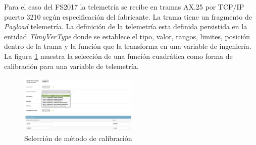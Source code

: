 \documentclass[twoside,twocolumn]{article}
\begin{document}
Para el caso del FS2017 la telemetría se recibe en tramas AX.25 por TCP/IP puerto 3210 según especificación del fabricante. La trama tiene un fragmento de \textit{Payload} telemetría. La definición de la telemetría esta definida persistida en la entidad \textit{TlmyVerType} donde se establece el tipo, valor, rangos, limites, posición dentro de la trama y la función que la transforma en una variable de ingeniería. La figura \ref{fig:MetodoCalibracion} muestra la selección de una función cuadrática como forma de calibración para una variable de telemetría.

\begin{figure}[]
  \caption{Selección de método de calibración}
  \label{fig:MetodoCalibracion}
  \centering
  \includegraphics[width=0.5\textwidth]{Imagenes/CalibrationMethod.png}
\end{figure}
\end{document}
